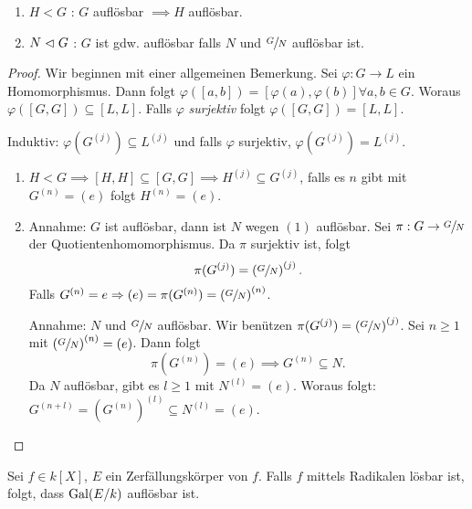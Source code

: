\begin{proposition}
	\begin{enumerate}[(1)]
		\item $H < G$ : $G$ auflösbar $\implies H$  auflösbar.
		\item $N \vartriangleleft G$ : $G$ ist gdw. auflösbar falls $N$ und $\sfrac{G}{N}$ auflösbar ist.
	\end{enumerate}
\end{proposition}

\begin{proof}
	Wir beginnen mit einer allgemeinen Bemerkung. 
	Sei $\varphi: G \to L$ ein Homomorphismus.
	Dann folgt $\varphi([a,b]) = [\varphi(a),\varphi(b)] \forall a,b \in G$. Woraus $\varphi([G,G]) \subseteq [L,L]$.
	Falls $\varphi$ \emph{surjektiv} folgt $\varphi([G,G]) = [L,L]$.

	Induktiv: $\varphi(G^{(j)}) \subseteq L^{(j)}$ und falls $\varphi$ surjektiv, $\varphi(G^{(j)}) = L^{(j)}$.
	\begin{enumerate}[(1)]
		\item $H < G \implies [H,H] \subseteq [G,G] \implies H^{(j)} \subseteq G^{(j)}$, falls es $n$ gibt mit $G^{(n)} = (e)$ folgt $H^{(n)} = (e)$.
		\item Annahme: $G$ ist auflösbar, dann ist $N$ wegen $(1)$ auflösbar. Sei $\pi: G \to \sfrac{G}{N}$ der Quotientenhomomorphismus.
			Da $\pi$ surjektiv ist, folgt
			\[
				\pi(G^{(j)}) = \left( \sfrac{G}{N} \right)^{(j)}
			.\] 
			Falls $G^{(n)} = e \Rightarrow (e) = \pi(G^{(n)}) = \left( \sfrac{G}{N} \right)^{(n)}$.
			
			Annahme: $N$ und $\sfrac{G}{N}$ auflösbar. Wir benützen $\pi(G^{(j)}) = \left( \sfrac{G}{N} \right)^{(j)}$.
			Sei $n \geq 1$ mit $\left( \sfrac{G}{N} \right)^{(n)} = (e)$. Dann folgt
			\[
				\pi(G^{(n)}) = (e) \implies G^{(n)} \subseteq N
			.\] 
			Da $N$ auflösbar, gibt es $l \geq 1$ mit $N^{(l)} = (e)$. Woraus folgt: $G^{(n+l)} = \left( G^{(n)} \right)^{(l)} \subseteq N^{(l)} = (e)$.
	\end{enumerate}
\end{proof}

\begin{theorem}
	Sei $f \in k[X]$, $E$ ein Zerfällungskörper von $f$. Falls $f$ mittels Radikalen lösbar ist, folgt, dass $\operatorname{Gal}(E / k)$ auflösbar ist.
\end{theorem}

